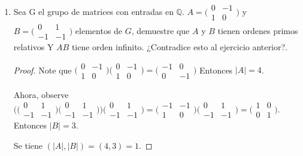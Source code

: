 \documentclass{article}
\theoremstyle{break}
\begin{document}
\begin{enumerate}
		\item Sea G el grupo de matrices con entradas en $\mathbb{Q}$.
$A=\bigl(\begin{smallmatrix}0&-1\\1&0\end{smallmatrix}\bigr)$ y $B=(\begin{smallmatrix}0&1\\-1&-1\end{smallmatrix}\bigr)$
	elementos de $G$, demuestre que $A$ y $B$ tienen ordenes primos relativos Y $AB$ tiene orden infinito. ¿Contradice esto al ejercicio anterior?.

		\begin{proof}
			Note que $\bigl(\begin{smallmatrix}0&-1\\1&0\end{smallmatrix}\bigr)\bigl(\begin{smallmatrix}0&-1\\1&0\end{smallmatrix}\bigr)=\bigl(\begin{smallmatrix}-1&0\\0&-1\end{smallmatrix}\bigr)$ Entonces $|A|=4$.
			
			Ahora, observe $\bigl(\bigl(\begin{smallmatrix}0&1\\-1&-1\end{smallmatrix}\bigr) \bigl(\begin{smallmatrix}0&1\\-1&-1\end{smallmatrix}\bigr)\bigr) \bigl(\begin{smallmatrix}0&1\\-1&-1\end{smallmatrix}\bigr)=\bigl(\begin{smallmatrix}-1&-1\\1&0\end{smallmatrix}\bigr) \bigl(\begin{smallmatrix}0&1\\-1&-1\end{smallmatrix}\bigr)=\bigl(\begin{smallmatrix}1&0\\0&1\end{smallmatrix}\bigr)$. Entonces $|B|=3$.
			
			Se tiene $(|A|,|B|)=(4,3)=1$.
			

\end{proof}
\end{enumerate}
\end{document}

